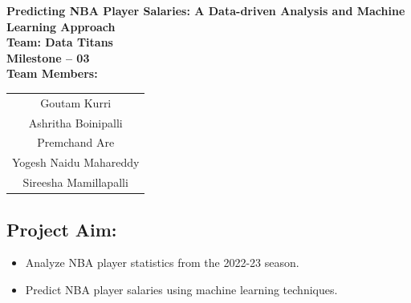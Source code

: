 \documentclass{article}
\begin{document}
\begin{titlepage}
    \centering
    \vspace*{2cm}
    {\LARGE \textbf{Predicting NBA Player Salaries: A Data-driven Analysis and Machine Learning Approach}}\\[1cm]
    {\Large \textbf{Team: Data Titans}}\\[0.5cm]
    {\Large \textbf{Milestone – 03}}\\[2cm]
    {\Large \textbf{Team Members:}}\\[1cm]
    \begin{tabular}{c}
        \Large Goutam Kurri \\[0.2cm]
        \Large Ashritha Boinipalli \\[0.2cm]
        \Large Premchand Are \\[0.2cm]
        \Large Yogesh Naidu Mahareddy \\[0.2cm]
        \Large Sireesha Mamillapalli \\[0.2cm]
    \end{tabular}
\end{titlepage}
\newpage
\subsection*{Project Aim:}
\begin{itemize}
    \item Analyze NBA player statistics from the 2022-23 season.
    \item Predict NBA player salaries using machine learning techniques.
\end{itemize}
\end{document}
